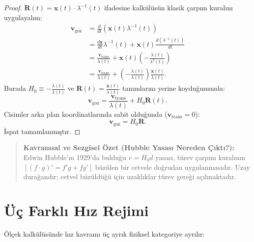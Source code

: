 \documentclass[11pt,a4paper]{article}
\begin{document}
\begin{proof}
    $\mathbf{R}(t) = \mathbf{x}(t) \cdot \lambda^{-1}(t)$ ifadesine kalkülüsün klasik çarpım kuralını uygulayalım:
    \begin{align*}
        \mathbf{v}_{\mathrm{goz}} & = \frac{d}{dt} \left( \mathbf{x}(t) \lambda^{-1}(t) \right)                                                                            \\
                                  & = \frac{d\mathbf{x}}{dt} \lambda^{-1}(t) + \mathbf{x}(t) \frac{d(\lambda^{-1}(t))}{dt}                                                 \\
                                  & = \frac{\mathbf{v}_{\mathrm{trans}}}{\lambda(t)} + \mathbf{x}(t) \left( -\frac{\dot{\lambda}(t)}{\lambda^2(t)} \right)                 \\
                                  & = \frac{\mathbf{v}_{\mathrm{trans}}}{\lambda(t)} + \left(-\frac{\dot{\lambda}(t)}{\lambda(t)}\right) \frac{\mathbf{x}(t)}{\lambda(t)}.
    \end{align*}
    Burada $H_0 \equiv -\frac{\dot{\lambda}(t)}{\lambda(t)}$ ve $\mathbf{R}(t) = \frac{\mathbf{x}(t)}{\lambda(t)}$ tanımlarını yerine koyduğumuzda:
    $$\mathbf{v}_{\mathrm{goz}} = \frac{\mathbf{v}_{\mathrm{trans}}}{\lambda(t)} + H_0 \mathbf{R}(t).$$
    Cisimler arka plan koordinatlarında sabit olduğunda ($\mathbf{v}_{\mathrm{trans}} = 0$):
    $$\mathbf{v}_{\mathrm{goz}} = H_0 \mathbf{R}.$$
    İspat tamamlanmıştır.
\end{proof}

\begin{quote}
    \small
    \textbf{Kavramsal ve Sezgisel Özet (Hubble Yasası Nereden Çıktı?):} \\
    Edwin Hubble'ın 1929'da bulduğu $v = H_0 d$ yasası, türev çarpım kuralının $[(f \cdot g)' = f'g + fg']$ büzülen bir cetvele doğrudan uygulanmasıdır. Uzay durağandır; cetvel büzüldüğü için uzaklıklar türev gereği açılmaktadır.
\end{quote}

\section{Üç Farklı Hız Rejimi}
\label{sec:uc_hiz}

Ölçek kalkülüsünde hız kavramı üç ayrık fiziksel kategoriye ayrılır:
\end{document}
